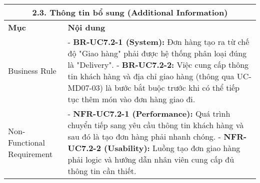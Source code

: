 \begin{longtable}{|m{4cm}|p{11cm}|}
\hline
\multicolumn{2}{|c|}{\textbf{2.3. Thông tin bổ sung (Additional Information)}} \\
\hline
\textbf{Mục} & \textbf{Nội dung} \\
\hline
Business Rule & - \textbf{BR-UC7.2-1 (System):} Đơn hàng tạo ra từ chế độ "Giao hàng" phải được hệ thống phân loại đúng là "Delivery". \newline - \textbf{BR-UC7.2-2:} Việc cung cấp thông tin khách hàng và địa chỉ giao hàng (thông qua UC-MD07-03) là bước bắt buộc trước khi có thể tiếp tục thêm món vào đơn hàng giao đi. \\
\hline
Non-Functional Requirement & - \textbf{NFR-UC7.2-1 (Performance):} Quá trình chuyển tiếp sang yêu cầu thông tin khách hàng và sau đó là tạo đơn hàng phải nhanh chóng. \newline - \textbf{NFR-UC7.2-2 (Usability):} Luồng tạo đơn giao hàng phải logic và hướng dẫn nhân viên cung cấp đủ thông tin cần thiết. \\
\hline
\end{longtable}

